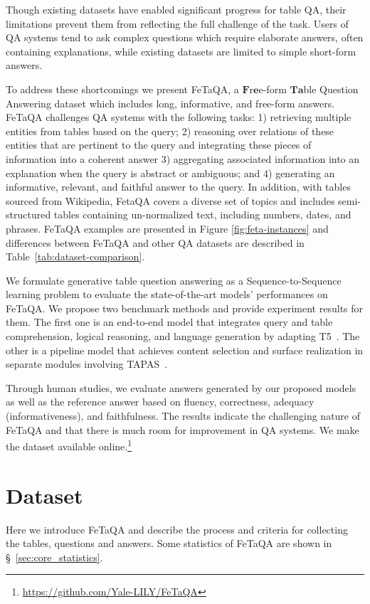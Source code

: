 \documentclass[11pt,a4paper]{article}
\newcommand{\ours}{FeTaQA\xspace}
\begin{document}
Though existing datasets have enabled significant progress for table QA, their limitations prevent them from reflecting the full challenge of the task. Users of QA systems tend to ask complex questions which require elaborate answers, often containing explanations, while existing datasets are limited to simple short-form answers. 

To address these shortcomings we present \ours, a $\textbf{F}$r$\textbf{e}$e-form $\textbf{Ta}$ble Question Answering dataset which includes long, informative, and free-form answers. FeTaQA challenges QA systems with the following tasks: 1) retrieving multiple entities from tables based on the query; 2) reasoning over relations of these entities that are pertinent to the query and integrating these pieces of information into a coherent answer 3) aggregating  associated information into an explanation when the query is abstract or ambiguous; and 4) generating an informative, relevant, and faithful answer to the query. In addition, with tables sourced from Wikipedia, FetaQA covers a diverse set of topics and includes semi-structured tables containing un-normalized text, including numbers, dates, and phrases. \ours examples are presented in Figure \ref{fig:feta-instances} and differences between \ours and other QA datasets are described in Table~\ref{tab:dataset-comparison}.

We formulate 
generative %
table question answering as a Sequence-to-Sequence learning problem to evaluate the state-of-the-art models' performances on \ours. We propose two benchmark methods and provide experiment results for them. The first one is an end-to-end model that integrates query and table comprehension, logical reasoning, and language generation by adapting T5~\cite{raffel-2019-t5}. The other is a pipeline model that achieves content selection and surface realization in separate modules involving TAPAS~\cite{herzig-etal-2020-tapas}. 

Through human studies, we evaluate answers generated by our proposed models as well as the reference answer based on fluency, correctness, adequacy (informativeness), and faithfulness. 
The results indicate the challenging nature of \ours and that there is much room for improvement in QA systems.
We make the dataset available online.\footnote{\url{https://github.com/Yale-LILY/FeTaQA}}

\section{Dataset}
Here we introduce \ours
and describe the process and criteria for collecting the tables, questions and answers. Some statistics of \ours are shown in \S~\ref{sec:core_statistics}.
\end{document}

